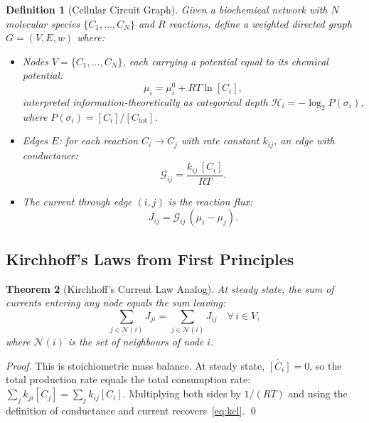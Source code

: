 \documentclass[11pt,twocolumn,a4paper]{article}
\newtheorem{theorem}{Theorem}[section]
\newtheorem{definition}[theorem]{Definition}
\newcommand{\Hcat}{\mathcal{H}}
\newcommand{\Gcond}{\mathcal{G}}
\begin{document}
\begin{definition}[Cellular Circuit Graph]
\label{def:circuit}
Given a biochemical network with $N$ molecular species
$\{C_1, \ldots, C_N\}$ and $R$ reactions, define a weighted directed
graph $G = (V, E, w)$ where:
\begin{itemize}[leftmargin=*,nosep]
\item Nodes $V = \{C_1, \ldots, C_N\}$, each carrying a \emph{potential}
  equal to its chemical potential:
  \begin{equation}
    \mu_i = \mu_i^0 + RT \ln [C_i],
    \label{eq:chemical-potential}
  \end{equation}
  interpreted information-theoretically as categorical depth
  $\Hcat_i = -\log_2 P(\sigma_i)$, where $P(\sigma_i) = [C_i]/[C_\mathrm{tot}]$.

\item Edges $E$: for each reaction $C_i \to C_j$ with rate constant
  $k_{ij}$, an edge with \emph{conductance}:
  \begin{equation}
    \Gcond_{ij} = \frac{k_{ij}\,[C_i]}{RT}.
    \label{eq:conductance}
  \end{equation}

\item The \emph{current} through edge $(i,j)$ is the reaction flux:
  \begin{equation}
    J_{ij} = \Gcond_{ij}\,(\mu_i - \mu_j).
    \label{eq:current}
  \end{equation}
\end{itemize}
\end{definition}

\subsection{Kirchhoff's Laws from First Principles}

\begin{theorem}[Kirchhoff's Current Law Analog]
\label{thm:kcl}
At steady state, the sum of currents entering any node equals the sum
leaving:
\begin{equation}
  \sum_{j \in \mathcal{N}(i)} J_{ji} = \sum_{j \in \mathcal{N}(i)} J_{ij}
  \quad \forall\, i \in V,
  \label{eq:kcl}
\end{equation}
where $\mathcal{N}(i)$ is the set of neighbours of node $i$.
\end{theorem}

\begin{proof}
This is stoichiometric mass balance.  At steady state,
$\dot{[C_i]} = 0$, so the total production rate equals the total
consumption rate:
$\sum_j k_{ji}[C_j] = \sum_j k_{ij}[C_i]$.  Multiplying both sides
by $1/(RT)$ and using the definition of conductance and current
recovers~\eqref{eq:kcl}.  \qed
\end{proof}
\end{document}
